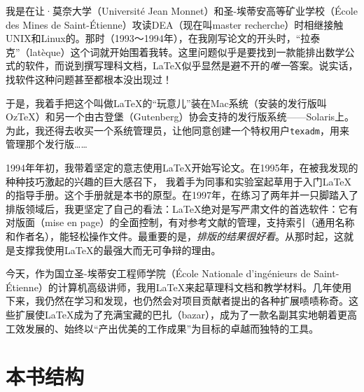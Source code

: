 我是在让·莫奈大学（Université Jean Monnet）和圣-埃蒂安高等矿业学校（École des Mines de Saint-Étienne）攻读DEA（现在叫master recherche）时相继接触UNIX和Linux的。那时（1993～1994年），在我刚写论文的开头时，“拉泰克”（latèque）这个词就开始围着我转。这里问题似乎是要找到一款能排出数学公式的软件，而说到撰写理科文档，\LaTeX 似乎显然是避不开的\emph{唯一}答案。说实话，找软件这种问题甚至都根本没出现过！

于是，我着手把这个叫做\LaTeX 的“玩意儿”装在Mac系统（安装的发行版叫Oz\TeX ）和另一个由古登堡（Gutenberg）协会支持的发行版系统——Solaris上。为此，我还得去收买一个系统管理员，让他同意创建一个特权用户\texttt{texadm}，用来管理那个发行版……

1994年年初，我带着坚定的意志使用\LaTeX 开始写论文。在1995年，在被我发现的种种技巧激起的兴趣的巨大感召下，%
我着手为同事和实验室起草用于入门\LaTeX 的指导手册。这个手册就是本书的原型。在1997年，在练习了两年并一只脚踏入了排版领域后，我更坚定了自己的看法：\LaTeX 绝对是写严肃文件的首选软件：它有对版面（mise en page）的全面控制，有对参考文献的管理，支持索引（通用名称和作者名），能轻松操作文件。最重要的是，\emph{排版的结果很好看}。从那时起，这就是支撑我使用\LaTeX 的最强大而无可争辩的理由。

今天，作为国立圣-埃蒂安工程师学院（École Nationale d’ingénieurs de Saint-Étienne）的计算机高级讲师，我用\LaTeX 来起草理科文档和教学材料。几年使用下来，我仍然在学习和发现，也仍然会对项目贡献者提出的各种扩展啧啧称奇。这些扩展使\LaTeX 成为了充满宝藏的巴扎（bazar），成为了一款名副其实地朝着更高工效发展的、始终以“产出优美的工作成果”为目标的卓越而独特的工具。

\section*{本书结构}


